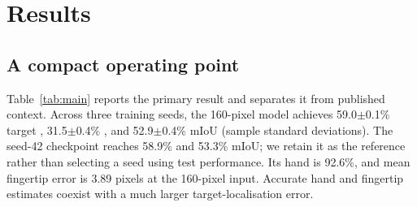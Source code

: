 \section{Results}\label{sec:results}
\subsection{A compact operating point}
Table~\ref{tab:main} reports the primary result and separates it from published context. Across three training seeds, the 160-pixel model achieves 59.0$\pm$0.1\% target , 31.5$\pm$0.4\% , and 52.9$\pm$0.4\% mIoU (sample standard deviations). The seed-42 checkpoint reaches 58.9\%  and 53.3\% mIoU; we retain it as the reference rather than selecting a seed using test performance. Its hand  is 92.6\%, and mean fingertip error is 3.89 pixels at the 160-pixel input. Accurate hand and fingertip estimates coexist with a much larger target-localisation error.

